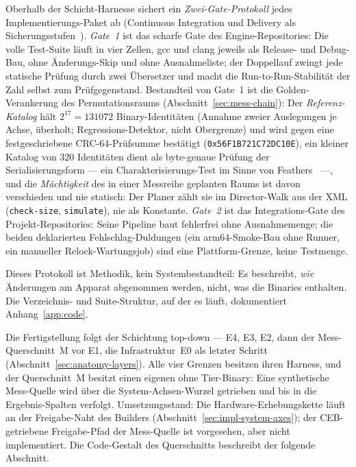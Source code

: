 \begin{nurkurz}
Oberhalb der Schicht-Harnesse sichert ein \emph{Zwei-Gate-Protokoll} jedes Implementierungs-Paket ab
(Continuous Integration und Delivery als Sicherungsstufen~\cite{fowler2006ci,humble2010cd}).
\emph{Gate~1} ist das scharfe Gate des Engine-Repositories: Die volle Test-Suite läuft in vier Zellen, gcc
und clang jeweils als Release- und Debug-Bau, ohne Änderungs-Skip und ohne Ausnahmeliste; der Doppellauf
zwingt jede statische Prüfung durch zwei Übersetzer und macht die Run-to-Run-Stabilität der Zahl selbst
zum Prüfgegenstand. Bestandteil von Gate~1 ist die Golden-Verankerung des Permutationsraums
(Abschnitt~\ref{sec:mess-chain}): Der \emph{Referenz-Katalog} hält $2^{17} = 131072$ Binary-Identitäten (Annahme zweier Auslegungen
je Achse, überholt; Regressions-Detektor, nicht Obergrenze) und wird gegen eine festgeschriebene CRC-64-Prüfsumme bestätigt (\texttt{0x56F1B721C72DC10E}), ein %
kleiner Katalog von $320$ Identitäten dient als byte-genaue Prüfung der Serialisierungsform --- ein
Charakterisierungs-Test im Sinne von Feathers~\cite{feathers2004legacy} ---, und die \emph{Mächtigkeit}
des in einer Messreihe geplanten Raums ist davon verschieden und nie statisch: Der Planer zählt sie im
Director-Walk aus der XML (\texttt{check-size}, \texttt{simulate}), nie als Konstante.
\emph{Gate~2} ist das Integrations-Gate des Projekt-Repositories: Seine Pipeline baut fehlerfrei ohne
Ausnahmemenge; die beiden deklarierten Fehlschlag-Duldungen (ein arm64-Smoke-Bau ohne Runner, ein
manueller Relock-Wartungsjob) sind eine Plattform-Grenze, keine Testmenge.

Dieses Protokoll ist Methodik, kein Systembestandteil: Es beschreibt, \emph{wie} Änderungen am
Apparat abgenommen werden, nicht, was die Binaries enthalten. Die Verzeichnis- und Suite-Struktur,
auf der es läuft, dokumentiert Anhang~\ref{app:code}.

Die Fertigstellung folgt der Schichtung top-down --- E4, E3, E2, dann der Mess-Querschnitt~M vor E1, die
Infrastruktur~E0 als letzter Schritt (Abschnitt~\ref{sec:anatomy-layers}). Alle vier Grenzen besitzen
ihren Harness, und der Querschnitt~M besitzt einen eigenen ohne Tier-Binary: Eine synthetische Mess-Quelle
wird über die System-Achsen-Wurzel getrieben und bis in die Ergebnis-Spalten verfolgt. Umsetzungsstand:
Die Hardware-Erhebungskette läuft an der Freigabe-Naht des Builders (Abschnitt~\ref{sec:impl-system-axes});
der CEB-getriebene Freigabe-Pfad der Mess-Quelle ist vorgesehen, aber nicht implementiert. Die Code-Gestalt
des Querschnitts beschreibt der folgende Abschnitt.
\end{nurkurz}

